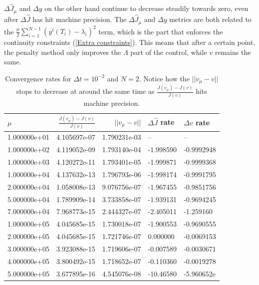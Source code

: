 \\
\\
$\Delta\hat J_{\mu}$ and $\Delta y$ on the other hand continue to decrease steadily towards zero, even after $\Delta \hat J$ has hit machine precision. The $\Delta\hat J_{\mu}$ and $\Delta y$ metrics are both related to the $\frac{\mu }{2}\sum_{i=1}^{N-1}(y^i(T_{i})-\lambda_i)^2$ term, which is the part that enforces the continuity constraints (\ref{Extra constraints}). This means that after a certain point, the penalty method only improves the $\Lambda$ part of the control, while $v$ remains the same. 
\begin{table}[!h]
\centering
\caption{Convergence rates for $\Delta t=10^{-2}$ and $N=2$. Notice how the $||v_{\mu}-v||$ stops to decrease at around the same time as $\frac{J(v_{\mu})-J(v)}{J(v)}$ hits machine precision.}
\label{Cosn_rate_table}
\begin{tabular}{lrrll}
\toprule
{} $\mu$&  $\frac{J(v_{\mu})-J(v)}{J(v)}$ &   $||v_{\mu}-v||$ &        $\Delta \hat J$ rate &        $\Delta v$ rate \\
\midrule
1.000000e+01 &      4.105697e-07 & 1.790231e-03 &            -- &            -- \\
1.000000e+02 &      4.119052e-09 & 1.793140e-04 & -1.998590 & -0.9992948 \\
1.000000e+03 &      4.120272e-11 & 1.793401e-05 & -1.999871 & -0.9999368 \\
1.000000e+04 &      4.137632e-13 & 1.796793e-06 & -1.998174 & -0.9991795 \\
2.000000e+04 &      1.058008e-13 & 9.076756e-07 & -1.967455 & -0.9851756 \\
5.000000e+04 &      1.789909e-14 & 3.733858e-07 & -1.939131 & -0.9694245 \\
7.000000e+04 &      7.968773e-15 & 2.444327e-07 & -2.405011 & -1.259160 \\
1.000000e+05 &      4.045685e-15 & 1.730018e-07 & -1.900553 & -0.9690555 \\
2.000000e+05 &      4.045685e-15 & 1.721746e-07 &  0.000000 & -0.0069153 \\
3.000000e+05 &      3.923088e-15 & 1.719606e-07 & -0.007589 & -0.0030671 \\
4.000000e+05 &      3.800492e-15 & 1.718652e-07 & -0.110360 & -0.0019278 \\
5.000000e+05 &      3.677895e-16 & 4.545076e-08 & -10.46580 & -5.960652e \\
\bottomrule
\end{tabular}
\end{table}
